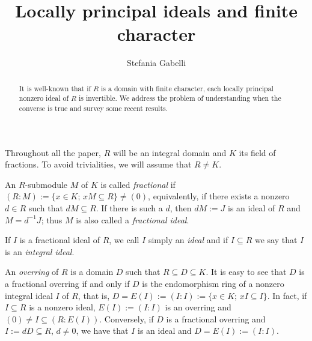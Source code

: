 \documentclass[12pt]{amsart}
\theoremstyle{definition}
\begin{document}
  \title{Locally principal ideals and finite character}

\keywords{}

\author{Stefania Gabelli}

\address{Dipartimento di Matematica, Universit\`{a} degli Studi Roma
Tre,
Largo S.  L.  Murialdo,
1, 00146 Roma, Italy
}


\date{}

\begin{abstract} It is well-known that if $R$ is a domain with finite character,  each locally principal nonzero  ideal of  $R$ is invertible. We address the problem of understanding when the converse is true and survey some recent results.
 \end{abstract}

\maketitle

\section*{}

 
 Throughout all the paper, $R$ will be an integral domain and $K$ its field of fractions. To avoid trivialities, we will assume that $R\neq K$. 
  
 An $R$-submodule $M$ of $K$ is called \emph{fractional} if $(R:M):=\{x\in K;\, xM{\subseteq} R\} \neq (0)$, equivalently, if there exists a nonzero $d\in R$ such that $dM{\subseteq} R$. If there is such a $d$, then $dM:=J$ is an ideal of $R$ and $M=d^{-1}J$; thus $M$ is also called  a \emph{fractional ideal}. 
 
  If $I$ is a fractional ideal of $R$, we call $I$ simply an \emph{ideal}  and if $I{\subseteq} R$ we say that $I$ is an \emph{integral ideal}. 
  
  An \emph{overring} of $R$ is a domain $D$ such that $R{\subseteq} D{\subseteq} K$. It is easy to see that $D$ is a fractional overring if and only if $D$ is the endomorphism ring of a nonzero integral ideal $I$ of $R$, that is, $D=E(I):=(I:I):=\{x\in K;\, xI{\subseteq} I\}$. In fact, if $I{\subseteq} R$ is a nonzero ideal, $E(I):=(I:I)$ is an overring and $(0) \neq I{\subseteq} (R:E(I))$. Conversely, if $D$ is a fractional overring and $I:=dD{\subseteq} R$,  $d\neq 0$, we have that $I$ is an ideal and $D=E(I):=(I:I)$. 
\end{document}
